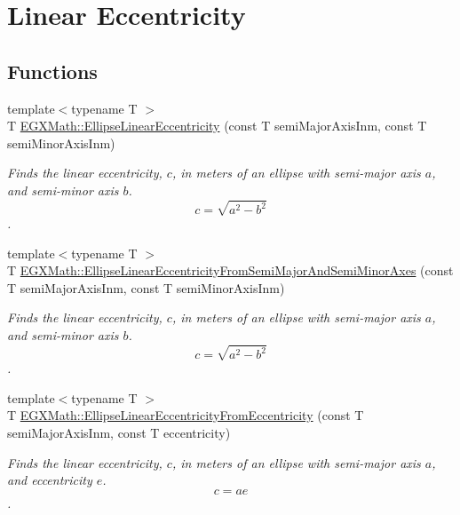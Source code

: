 \hypertarget{group___e_g_x_math-_geometry-2_d-_ellipse-_linear_eccentricity}{}\section{Linear Eccentricity}
\label{group___e_g_x_math-_geometry-2_d-_ellipse-_linear_eccentricity}
\subsection*{Functions}
\begin{DoxyCompactItemize}
\item 
{\footnotesize template$<$typename T $>$ }\\T \mbox{\hyperlink{group___e_g_x_math-_geometry-2_d-_ellipse-_linear_eccentricity_gac70b3010e30aa8b73deb50fe2b9b9a91}{E\+G\+X\+Math\+::\+Ellipse\+Linear\+Eccentricity}} (const T semi\+Major\+Axis\+Inm, const T semi\+Minor\+Axis\+Inm)
\begin{DoxyCompactList}\small\item\em Finds the linear eccentricity, $c$, in meters of an ellipse with semi-\/major axis $a$, and semi-\/minor axis $b$. \[ c=\sqrt{a^2-b^2} \]. \end{DoxyCompactList}\item 
{\footnotesize template$<$typename T $>$ }\\T \mbox{\hyperlink{group___e_g_x_math-_geometry-2_d-_ellipse-_linear_eccentricity_gaa5eb80a161cf3597ea6971f4a1d2f8e8}{E\+G\+X\+Math\+::\+Ellipse\+Linear\+Eccentricity\+From\+Semi\+Major\+And\+Semi\+Minor\+Axes}} (const T semi\+Major\+Axis\+Inm, const T semi\+Minor\+Axis\+Inm)
\begin{DoxyCompactList}\small\item\em Finds the linear eccentricity, $c$, in meters of an ellipse with semi-\/major axis $a$, and semi-\/minor axis $b$. \[ c=\sqrt{a^2-b^2} \]. \end{DoxyCompactList}\item 
{\footnotesize template$<$typename T $>$ }\\T \mbox{\hyperlink{group___e_g_x_math-_geometry-2_d-_ellipse-_linear_eccentricity_gad768e5a198895dd2646b190b7d3208de}{E\+G\+X\+Math\+::\+Ellipse\+Linear\+Eccentricity\+From\+Eccentricity}} (const T semi\+Major\+Axis\+Inm, const T eccentricity)
\begin{DoxyCompactList}\small\item\em Finds the linear eccentricity, $c$, in meters of an ellipse with semi-\/major axis $a$, and eccentricity $e$. \[ c=a e \]. \end{DoxyCompactList}\end{DoxyCompactItemize}


